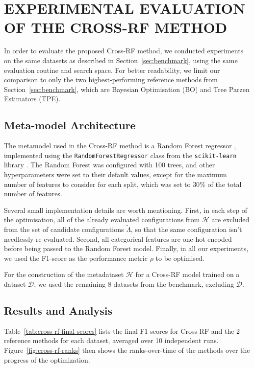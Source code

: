 \section{\uppercase{Experimental evaluation of the Cross-RF method}}
\label{sec:experimental-evaluation}

In order to evaluate the proposed Cross-RF method, we conducted experiments on the same datasets as described in Section~\ref{sec:benchmark}, using the same evaluation routine and search space. For better readability, we limit our comparison to only the two highest-performing reference methods from Section~\ref{sec:benchmark}, which are Bayesian Optimisation (BO) and Tree Parzen Estimators (TPE).

\subsection{Meta-model Architecture}

The metamodel used in the Cross-RF method is a Random Forest regressor \cite{breiman_random_2001}, implemented using the \texttt{RandomForestRegressor} class from the \texttt{scikit-learn} library \cite{pedregosa_scikit-learn_2011}. The Random Forest was configured with 100 trees, and other hyperparameters were set to their default values, except for the maximum number of features to consider for each split, which was set to \( 30\% \) of the total number of features.

Several small implementation details are worth mentioning. First, in each step of the optimisation, all of the already evaluated configurations from \( \mathcal{H} \) are excluded from the set of candidate configurations \( \tilde{\Lambda} \), so that the same configuration isn't needlessly re-evaluated. Second, all categorical features are one-hot encoded before being passed to the Random Forest model. Finally, in all our experiments, we used the F1-score as the performance metric \( \rho \) to be optimised.

For the construction of the metadataset \( \mathcal{H} \) for a Cross-RF model trained on a dataset \( \mathcal{D} \), we used the remaining 8 datasets from the benchmark, excluding \( \mathcal{D} \).

\subsection{Results and Analysis}
Table~\ref{tab:cross-rf-final-scores} lists the final F1 scores for Cross-RF and the 2 reference methods for each dataset, averaged over 10 independent runs. Figure~\ref{fig:cross-rf-ranks} then shows the ranks-over-time of the methods over the progress of the optimization.

